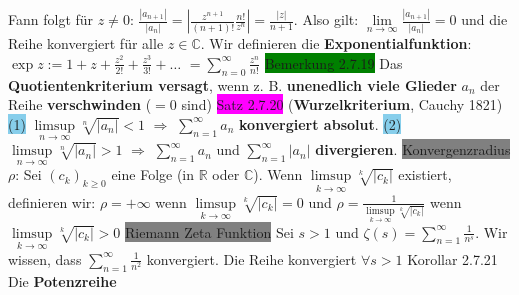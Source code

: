 \documentclass[landscape, 10pt]{article}
\newcommand{\R}{\mathbb{R}}
\newcommand{\C}{\mathbb{C}}
\begin{document}
\begin{multicols}{3}
                     Fann folgt für $z\neq0$:
                     $\frac{|a_{n+1}|}{|a_n|}
                     =|\frac{z^{n+1}}{(n+1)!}\frac{n!}{z^n}|
                     =\frac{|z|}{n+1}$. Also gilt:
                     $\lim\limits_{n\to\infty}\frac{|a_{n+1}|}{|a_n|}=0$
                     und die Reihe konvergiert 
                     für alle $z\in\C$.
                     Wir definieren die \textbf{Exponentialfunktion}: 
                     $\exp z:=1+z+\frac{z^2}{2!}+\frac{z^3}{3!}+\dots$
                     $=\sum_{n=0}^\infty\frac{z^n}{n!}$
              \colorbox{green}{Bemerkung 2.7.19} Das \textbf{Quotientenkriterium versagt}, wenn z. B. 
                     \textbf{unenedlich viele Glieder} $a_n$ der Reihe 
                     \textbf{verschwinden} ($=0$ sind)
              \colorbox{magenta}{Satz 2.7.20} (\textbf{Wurzelkriterium}, Cauchy 1821)
                     \colorbox{SkyBlue}{(1)} 
                     \textcolor{NavyBlue}{$\limsup\limits_{n\to\infty}\sqrt[n]{|a_n|}<1$}
                     $\Longrightarrow$
                     \textcolor{NavyBlue}{$\sum_{n=1}^\infty a_n$} \textbf{konvergiert absolut}.
                     \colorbox{SkyBlue}{(2)} 
                     \textcolor{NavyBlue}{$\limsup\limits_{n\to\infty}\sqrt[n]{|a_n|}>1$}
                     $\Longrightarrow$
                     \textcolor{NavyBlue}{$\sum_{n=1}^\infty a_n$} und 
                     \textcolor{NavyBlue}{$\sum_{n=1}^\infty |a_n|$}
                     \textbf{divergieren}.
              \colorbox{gray}{Konvergenzradius} \textcolor{NavyBlue}{$\rho$}: 
                     Sei \textcolor{NavyBlue}{$(c_k)_{k\geqslant0}$} eine Folge 
                     (in $\R$ oder $\C$). Wenn 
                     \textcolor{NavyBlue}{$\limsup\limits_{k\to\infty}\sqrt[k]{|c_k|}$} 
                     existiert, definieren wir: 
                     \textcolor{NavyBlue}{$\rho=+\infty$}
                     wenn \textcolor{NavyBlue}{$\limsup\limits_{k\to\infty}\sqrt[k]{|c_k|}=0$}
                     und 
                     \textcolor{NavyBlue}{$\rho=\frac{1}{\limsup\limits_{k\to\infty}\sqrt[k]{|c_k|}}$}
                     wenn 
                     \textcolor{NavyBlue}{$\limsup\limits_{k\to\infty}\sqrt[k]{|c_k|} >0$}
              \colorbox{gray}{Riemann Zeta Funktion} Sei $s>1$ und 
                     $\zeta(s)=\sum_{n=1}^\infty\frac{1}{n^s}$.
                     Wir wissen, dass
                     $\sum_{n=1}^\infty\frac{1}{n^2}$ konvergiert.
                     Die Reihe 
                     konvergiert $\forall s>1$
              \colorbox{BurntOrange}{Korollar 2.7.21} Die \textbf{Potenzreihe}

\end{multicols}
\end{document}
